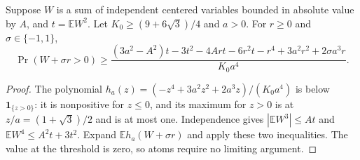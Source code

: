 \begin{lemma}\label{j:local:shortloc:quartic}
Suppose $W$ is a sum of independent centered variables bounded in absolute
value by $A$, and $t=\mathbb E W^2$. Let $K_0\ge(9+6\sqrt3)/4$ and $a>0$.
For $r\ge0$ and $\sigma\in\{-1,1\}$,
\begin{equation}\label{j:local:shortloc:quarticformula}
 \Pr(W+\sigma r>0)\ge
 \frac{(3a^2-A^2)t-3t^2-4Art-6r^2t-r^4
                      +3a^2r^2+2\sigma a^3r}{K_0a^4}.
\end{equation}
\end{lemma}
\begin{proof}
The polynomial $h_a(z)=(-z^4+3a^2z^2+2a^3z)/(K_0a^4)$ is below
$\mathbf1_{\{z>0\}}$: it is nonpositive for $z\le0$, and its maximum for
$z>0$ is at $z/a=(1+\sqrt3)/2$ and is at most one. Independence gives
$|\mathbb E W^3|\le At$ and $\mathbb E W^4\le A^2t+3t^2$.
Expand $\mathbb Eh_a(W+\sigma r)$ and apply these two inequalities.
The value at the threshold is zero, so atoms require no limiting argument.
\end{proof}

